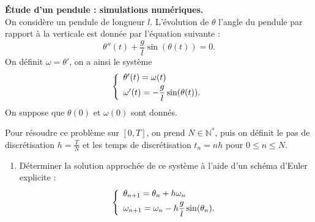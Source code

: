 \documentclass[12pt]{article}
\begin{document}
\begin{exo}\textbf{\'Etude d'un pendule : simulations num\'eriques.}
  \label{ex:pt_milieu}
  \\
  On consid\`ere un pendule de longueur $l$. L'\'evolution de $\theta$ l'angle du pendule par rapport \`a la verticale est donn\'ee par l'\'equation suivante :
$$
\theta''(t)+\frac{g}{l}\sin(\theta(t))=0.
$$
On d\'efinit $\omega=\theta'$, on a ainsi le syst\`eme 
\begin{equation*}
\left\{
\begin{array}{l}
\theta'(t)=\omega(t) \vspace{0.1cm}\\
\omega'(t)=-\displaystyle\frac{g}{l}\sin(\theta(t)).
\end{array}
\right.
\end{equation*}
On suppose que $\theta(0)$ et  $\omega(0)$ sont donn\'es. 

Pour r\'esoudre ce probl\`eme sur $[0,T]$, on prend $N \in \mathbb{N}^*$, puis on d\'efinit le pas de discr\'etisation $h=\frac TN$ et  les temps de discr\'etisation $t_n=nh$ pour $0 \leq n \leq N$.  


\begin{enumerate}
\item D\'eterminer la solution approch\'ee de ce syst\`eme \`a l'aide d'un sch\'ema d'Euler explicite :
\begin{equation*}
\left\{
\begin{array}{l}
\theta_{n+1}=\theta_n+h\omega_{n}\vspace{0.1cm}\\
\omega_{n+1}=\omega_n-h\displaystyle\frac{g}{l}\sin(\theta_{n}).
\end{array}
\right.
\end{equation*}


\end{enumerate}
\end{exo}
\end{document}
